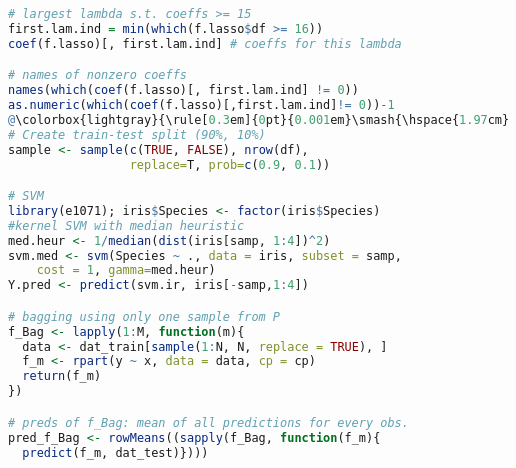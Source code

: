 \begin{lstlisting}[language=R]
# largest lambda s.t. coeffs >= 15
first.lam.ind = min(which(f.lasso$df >= 16)) 
coef(f.lasso)[, first.lam.ind] # coeffs for this lambda

# names of nonzero coeffs
names(which(coef(f.lasso)[, first.lam.ind] != 0)) 
as.numeric(which(coef(f.lasso)[,first.lam.ind]!= 0))-1 
@\colorbox{lightgray}{\rule[0.3em]{0pt}{0.001em}\smash{\hspace{1.97cm} Miscellaneous\hspace{1.97cm}}}@
# Create train-test split (90%, 10%)
sample <- sample(c(TRUE, FALSE), nrow(df), 
                 replace=T, prob=c(0.9, 0.1))

# SVM
library(e1071); iris$Species <- factor(iris$Species)
#kernel SVM with median heuristic
med.heur <- 1/median(dist(iris[samp, 1:4])^2)
svm.med <- svm(Species ~ ., data = iris, subset = samp,
    cost = 1, gamma=med.heur)
Y.pred <- predict(svm.ir, iris[-samp,1:4])

# bagging using only one sample from P
f_Bag <- lapply(1:M, function(m){
  data <- dat_train[sample(1:N, N, replace = TRUE), ]
  f_m <- rpart(y ~ x, data = data, cp = cp)
  return(f_m)
})

# preds of f_Bag: mean of all predictions for every obs.
pred_f_Bag <- rowMeans((sapply(f_Bag, function(f_m){
  predict(f_m, dat_test)})))
\end{lstlisting}
